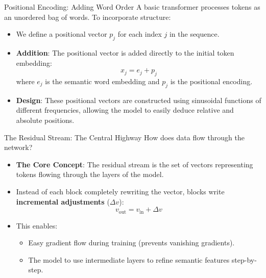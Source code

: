 \documentclass[aspectratio=169]{beamer}
\begin{document}
\begin{frame}{Positional Encoding: Adding Word Order}
  A basic transformer processes tokens as an unordered bag of words. To incorporate structure:
  
  \begin{itemize}
    \item We define a positional vector $p_j$ for each index $j$ in the sequence.
    \item \textbf{Addition}: The positional vector is added directly to the initial token embedding:
      \[
      x_j = e_j + p_j
      \]
      where $e_j$ is the semantic word embedding and $p_j$ is the positional encoding.
    \item \textbf{Design}: These positional vectors are constructed using sinusoidal functions of different frequencies, allowing the model to easily deduce relative and absolute positions.
  \end{itemize}
\end{frame}

\begin{frame}{The Residual Stream: The Central Highway}
  How does data flow through the network?
  
  \begin{itemize}
    \item \textbf{The Core Concept}: The residual stream is the set of vectors representing tokens flowing through the layers of the model.
    \item Instead of each block completely rewriting the vector, blocks write \textbf{incremental adjustments} ($\Delta v$):
      \[
      v_{\text{out}} = v_{\text{in}} + \Delta v
      \]
    \item This enables:
      \begin{itemize}
        \item Easy gradient flow during training (prevents vanishing gradients).
        \item The model to use intermediate layers to refine semantic features step-by-step.
      \end{itemize}
  \end{itemize}
\end{frame}
\end{document}
